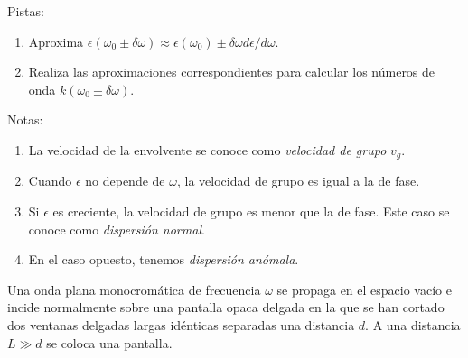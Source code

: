\documentclass{exam}
\newenvironment{pistas}{\par\noindent Pistas:\begin{enumerate}} {\end{enumerate}}
\newenvironment{notas}{\par\noindent Notas:\begin{enumerate}} {\end{enumerate}}
\begin{document}
\begin{questions}
  \begin{pistas}
  \item Aproxima
    $\epsilon(\omega_0\pm\delta\omega)\approx\epsilon(\omega_0)\pm\delta\omega
    d\epsilon/d\omega$.
  \item Realiza las aproximaciones correspondientes para calcular los
    números de onda $k(\omega_0\pm\delta\omega)$.
  \end{pistas}
  \begin{notas}
  \item La velocidad de la envolvente se conoce como {\em velocidad de
      grupo} $v_g$.
  \item Cuando $\epsilon$ no depende de $\omega$, la velocidad de
    grupo es igual a la de fase.
  \item Si $\epsilon$ es creciente, la velocidad de grupo es menor que
    la de fase. Este caso se conoce como {\em dispersión normal}.
  \item En el caso opuesto, tenemos {\em dispersión anómala}.
  \end{notas}
\question\label{k} Una onda plana monocromática de frecuencia $\omega$ se
  propaga en el espacio vacío e incide normalmente sobre una pantalla opaca
  delgada en la que se han cortado dos ventanas delgadas largas idénticas
  separadas una distancia $d$. A una distancia $L\gg d$ se coloca una
  pantalla.
\end{questions}
\end{document}
